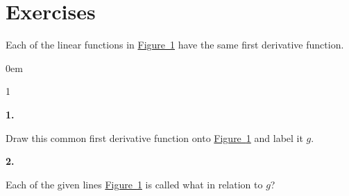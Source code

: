 \documentclass[12pt,]{book}
\theoremstyle{plain}
\theoremstyle{definition}
\numberwithin{equation}{section}
\newenvironment{exercisegroup}%
{\medskip\noindent}%
{\par\bigskip}%
\newlength{\exercisegroupindent}%
\newlength{\exercisegroupitemwidth}%
\newenvironment{exercisegrouplist}%
{\vspace{-\partopsep}%
\begin{adjustwidth}{\exercisegroupindent}{0em}}%
{\end{adjustwidth}%
\vspace{-\partopsep}%
\vspace{\baselineskip}}%
\newenvironment{exercisegroupbycol}[1]%
{\begin{exercisegrouplist}%
\vspace{-\multicolsep}%
\begin{multicols}{#1}%
\setlength{\parindent}{0em}%
\setlength{\exercisegroupitemwidth}{\linewidth}}%
{\end{multicols}%
\vspace{-\multicolsep}%
\end{exercisegrouplist}}%
\newenvironment{exercisegroupitem}[1]%
{\begin{minipage}[t]{\exercisegroupitemwidth}
\vspace{0pt}%
{\bfseries#1}%
\rule{0pt}{\baselineskip}}{\strut%
\end{minipage}%
\hspace{\columnsep}}%
\providecommand\phantomsection{}
\begin{document}
\section*{Exercises}\label{exercises-25}

\begin{exercisegroup}%
Each of the linear functions in \hyperref[figure-parallel-lines]{Figure~\ref*{figure-parallel-lines}} have the same first derivative function.%
\begin{figure}
\centering
{
}
\caption{\label{figure-parallel-lines}}
\end{figure}
\begin{exercisegroupbycol}{1}%
\begin{exercisegroupitem}{1. }\phantomsection\hypertarget{exercise-184}{\null}
Draw this common first derivative function onto \hyperref[figure-parallel-lines]{Figure~\ref*{figure-parallel-lines}} and label it \(g\).%
\end{exercisegroupitem}%
\par%
\begin{exercisegroupitem}{2. }\phantomsection\hypertarget{exercise-185}{\null}
Each of the given lines \hyperref[figure-parallel-lines]{Figure~\ref*{figure-parallel-lines}} is called what in relation to \(g\)?%
\end{exercisegroupitem}%
\par%
\end{exercisegroupbycol}%
\end{exercisegroup}%
\end{document}
